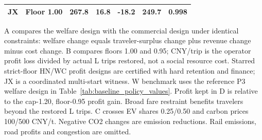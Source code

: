 \begin{table}[htbp]
\begin{minipage}{.95\textwidth}
\begin{tabular*}{\linewidth}{@{\extracolsep{\fill}}llrrrrr@{}}
JX & Floor 1.00 & 267.8 & 16.8 & -18.2 & 249.7 & 0.998 \\
\bottomrule\end{tabular*}\par\medskip
\par\noindent\fontsize{8}{9.5}\selectfont A compares the welfare design with the commercial design under identical constraints: welfare change equals traveler-surplus change plus revenue change minus cost change. B compares floors 1.00 and 0.95; CNY/trip is the operator profit loss divided by actual L trips restored, not a social resource cost. Starred strict-floor HN/WC profit designs are certified with hard retention and finance; JX is a coordinated multi-start witness. W benchmark uses the reference P3 welfare design in Table~\ref{tab:baseline_policy_values}. Profit kept in D is relative to the cap-1.20, floor-0.95 profit gain. Broad fare restraint benefits travelers beyond the restored L trips. C crosses EV shares 0.25/0.50 and carbon prices 100/500 CNY/t. Negative CO2 changes are emission reductions. Rail emissions, road profits and congestion are omitted.
\end{minipage}\end{table}
